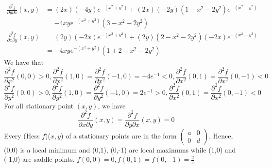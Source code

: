 \documentclass[11pt]{article}
\begin{document}
\begin{equation*}
\begin{aligned}
\frac{\partial^2 f}{\partial y \partial x}(x,y) &= (2x)(-4y)e^{-(x^2+y^2)} + (2x)(-2y)(1-x^2-2y^2)e^{-(x^2+y^2)}\\
&= -4xye^{-(x^2+y^2)}(3-x^2-2y^2)
\end{aligned}
\end{equation*}
\begin{equation*}
\begin{aligned}
\frac{\partial^2 f}{\partial x \partial y}(x,y) &=(2y)(-2x)e^{-(x^2+y^2)} + (2y)(2-x^2-2y^2)(-2x)e^{-(x^2+y^2)}\\
&= -4xye^{-(x^2+y^2)}(1 +2 -x^2-2y^2)
\end{aligned}
\end{equation*}
We have that 
\[
\frac{\partial^2 f}{\partial x^2} (0,0) > 0, \frac{\partial^2 f}{\partial x^2}(1,0) = \frac{\partial^2 f}{\partial x^2} (-1,0) = -4e^{-1}< 0, \frac{\partial^2 f}{\partial x^2}(0,1) = \frac{\partial^2 f}{\partial x^2}(0,-1) < 0 
\]
\[
\frac{\partial^2 f}{\partial y^2} (0,0) > 0, \frac{\partial^2 f}{\partial y^2}(1,0) = \frac{\partial^2 f}{\partial y^2} (-1,0) = 2e^{-1}> 0, \frac{\partial^2 f}{\partial x^2}(0,1) = \frac{\partial^2 f}{\partial x^2}(0,-1) < 0 
\]
For all stationary point $(x,y)$, we have
\[
\frac{\partial^2 f}{\partial x \partial y}(x,y) = \frac{\partial^2 f}{\partial y \partial x}(x,y) = 0
\]
Every (Hess $f$)($x,y$) of a stationary points are in the form $\begin{pmatrix} a & 0 \\ 0 &d \end{pmatrix}$. Hence, (0,0) is a local minimum and (0,1), (0,-1) are local maximums while (1,0) and (-1,0) are saddle points. 
$f(0,0) = 0, f(0,1) = f(0,-1) = \frac{2}{e}$
\pagebreak
\end{document}
